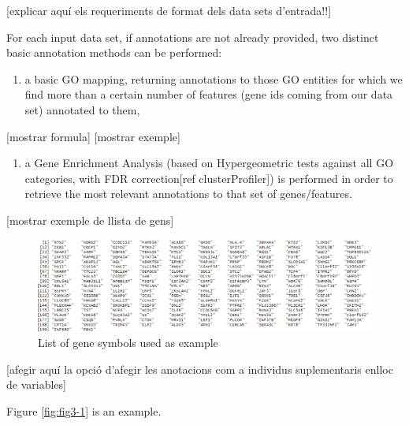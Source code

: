 \documentclass[a4paper, nobind]{templates/ociamthesis}
\providecommand{\tightlist}{%
  \setlength{\itemsep}{0pt}\setlength{\parskip}{0pt}}
\begin{document}
{[}explicar aquí els requeriments de format dels data sets d'entrada!!{]}

For each input data set, if annotations are not already provided, two distinct basic annotation methods can be performed:

\begin{enumerate}
\def\labelenumi{(\roman{enumi})}
\tightlist
\item
  a basic GO mapping, returning annotations to those GO entities for which we find more than a certain number of features (gene ids coming from our data set) annotated to them,
\end{enumerate}

{[}mostrar formula{]} {[}mostrar exemple{]}

\begin{enumerate}
\def\labelenumi{(\roman{enumi})}
\setcounter{enumi}{1}
\tightlist
\item
  a Gene Enrichment Analysis (based on Hypergeometric tests against all GO categories, with FDR correction{[}ref clusterProfiler{]}) is performed in order to retrieve the most relevant annotations to that set of genes/features.
\end{enumerate}

{[}mostrar exemple de llista de gens{]}

\begin{figure}

{\centering \includegraphics[width=0.95\linewidth]{figures/chapter3/3-8_gene_list} 

}

\caption{List of gene symbols used as example}\label{fig:fig3-8}
\end{figure}

{[}afegir aquí la opció d'afegir les anotacions com a individus suplementaris enlloc de variables{]}

Figure \ref{fig:fig3-1} is an example.
\end{document}
